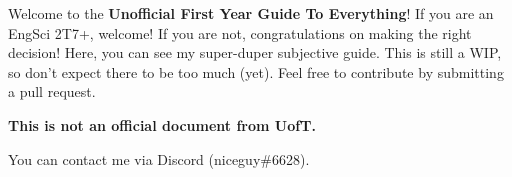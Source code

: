 Welcome to the \textbf{Unofficial First Year Guide To Everything}! If you are an EngSci 2T7+, welcome! If you are not, congratulations on making the right decision! Here, you can see my super-duper subjective guide. This is still a WIP, so don't expect there to be too much (yet). Feel free to contribute by submitting a pull request.

\bigskip
\centerline{\textbf{This is not an official document from UofT.}}
\bigskip

You can contact me via Discord (niceguy\#6628).
